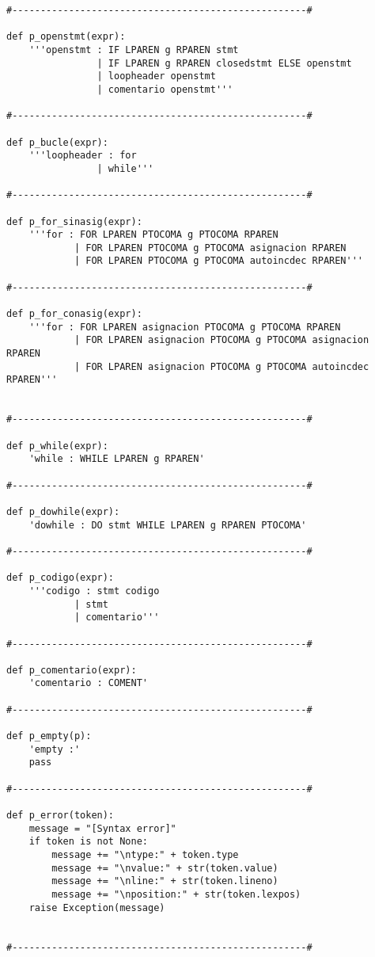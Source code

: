 \begin{verbatim}
#----------------------------------------------------#

def p_openstmt(expr):
	'''openstmt : IF LPAREN g RPAREN stmt
				| IF LPAREN g RPAREN closedstmt ELSE openstmt
				| loopheader openstmt
				| comentario openstmt'''

#----------------------------------------------------#

def p_bucle(expr):
	'''loopheader : for
				| while'''

#----------------------------------------------------#

def p_for_sinasig(expr):
	'''for : FOR LPAREN PTOCOMA g PTOCOMA RPAREN
			| FOR LPAREN PTOCOMA g PTOCOMA asignacion RPAREN 
			| FOR LPAREN PTOCOMA g PTOCOMA autoincdec RPAREN'''

#----------------------------------------------------#

def p_for_conasig(expr):
	'''for : FOR LPAREN asignacion PTOCOMA g PTOCOMA RPAREN
			| FOR LPAREN asignacion PTOCOMA g PTOCOMA asignacion RPAREN
			| FOR LPAREN asignacion PTOCOMA g PTOCOMA autoincdec RPAREN'''


#----------------------------------------------------#

def p_while(expr):
	'while : WHILE LPAREN g RPAREN'

#----------------------------------------------------#

def p_dowhile(expr):
	'dowhile : DO stmt WHILE LPAREN g RPAREN PTOCOMA'

#----------------------------------------------------#

def p_codigo(expr):
	'''codigo : stmt codigo
		    | stmt
		    | comentario'''

#----------------------------------------------------#

def p_comentario(expr):
	'comentario : COMENT'

#----------------------------------------------------#

def p_empty(p):
	'empty :'
	pass

#----------------------------------------------------#

def p_error(token):
    message = "[Syntax error]"
    if token is not None:
        message += "\ntype:" + token.type
        message += "\nvalue:" + str(token.value)
        message += "\nline:" + str(token.lineno)
        message += "\nposition:" + str(token.lexpos)
    raise Exception(message)


#----------------------------------------------------#

\end{verbatim}